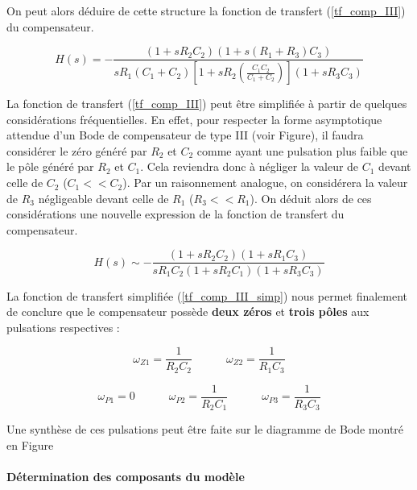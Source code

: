 				On peut alors déduire de cette structure la fonction de transfert 
				(\ref{tf_comp_III}) du compensateur.
					
				\begin{equation}
					H(s) 
					= 
					-\frac{(1+s R_2 C_2)(1+s(R_1+R_3)C_3)}
					{sR_1(C_1+C_2)
					\left[1+sR_2\left(\frac{C_1C_2}{C_1+C_2}\right)\right]
					(1+sR_3C_3)}
					\label{tf_comp_III}
				\end{equation}
					
				La fonction de transfert (\ref{tf_comp_III}) peut être simplifiée 
				à partir de quelques considérations fréquentielles. En effet, pour 
				respecter la forme asymptotique attendue d'un Bode de compensateur 
				de type III (voir Figure), il faudra considérer le zéro généré par 
				$R_2$ et $C_2$ comme ayant une pulsation plus faible que le pôle 
				généré par $R_2$ et $C_1$. 
				Cela reviendra donc à négliger la valeur de $C_1$ devant celle de 
				$C_2$ ($C_1 << C_2$). 
				Par un raisonnement analogue, on considérera la valeur de $R_3$ 
				négligeable devant celle de $R_1$ ($R_3 << R_1$). 
				On déduit alors de ces considérations une nouvelle expression de 
				la fonction de transfert du compensateur.
					
				\begin{equation}
					H(s) \sim -\frac{(1+s R_2 C_2)(1+sR_1 C_3)}
					{sR_1 C_2 (1+sR_2 C_1) (1+sR_3C_3)}
					\label{tf_comp_III_simp}
				\end{equation}
					
				La fonction de transfert simplifiée (\ref{tf_comp_III_simp}) nous 
				permet finalement de conclure que le compensateur possède 
				\textbf{deux zéros} et \textbf{trois pôles} aux pulsations 
				respectives :
					
				\begin{equation}
					\omega_{Z1} = \frac{1}{R_2C_2}
					\quad\quad\quad
					\omega_{Z2} = \frac{1}{R_1C_3}
				\end{equation}
					
				\begin{equation}
					\omega_{P1} = 0
					\quad\quad\quad
					\omega_{P2} = \frac{1}{R_2C_1}
					\quad\quad\quad
					\omega_{P3} = \frac{1}{R_3C_3}
				\end{equation}
					
				Une synthèse de ces pulsations peut être faite sur le diagramme de 
				Bode montré en Figure 					
					
				\paragraph{Détermination des composants du modèle}
				
